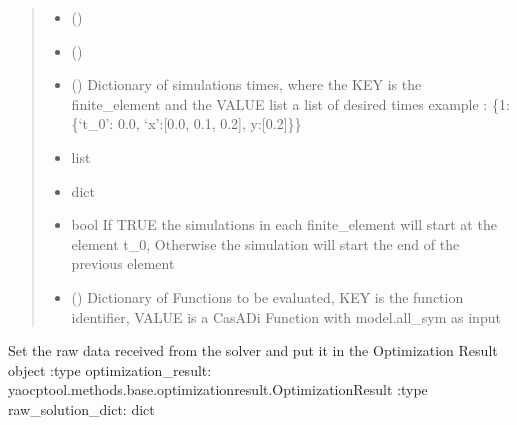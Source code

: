 \documentclass[letterpaper,10pt,english]{sphinxmanual}
\begin{document}
\begin{fulllineitems}
\begin{fulllineitems}
\begin{quote}
\begin{description}
\begin{itemize}
\item {} 
 () \textendash{} 

\item {} 
 () \textendash{} 

\item {} 
 () \textendash{} Dictionary of simulations times, where the KEY is the
finite\_element and the VALUE list a list of desired times
example : \{1:\{‘t\_0’: 0.0, ‘x’:{[}0.0, 0.1, 0.2{]}, y:{[}0.2{]}\}\}

\item {} 
 \textendash{} list

\item {} 
 \textendash{} dict

\item {} 
 \textendash{} bool If TRUE the simulations in each finite\_element will start at the element t\_0,
Otherwise the simulation will start the end of the previous element

\item {} 
 () \textendash{} Dictionary of Functions to be evaluated, KEY is the function
identifier, VALUE is a CasADi Function with model.all\_sym as input

\end{itemize}

\end{description}\end{quote}

\end{fulllineitems}


\begin{fulllineitems}
\label{\detokenize{yaocptool.methods.classic:yaocptool.methods.classic.collocationscheme.CollocationScheme.set_data_to_optimization_result_from_raw_data}}
Set the raw data received from the solver and put it in the Optimization Result object
:type optimization\_result: yaocptool.methods.base.optimizationresult.OptimizationResult
:type raw\_solution\_dict: dict


\end{fulllineitems}
\end{fulllineitems}
\end{document}
